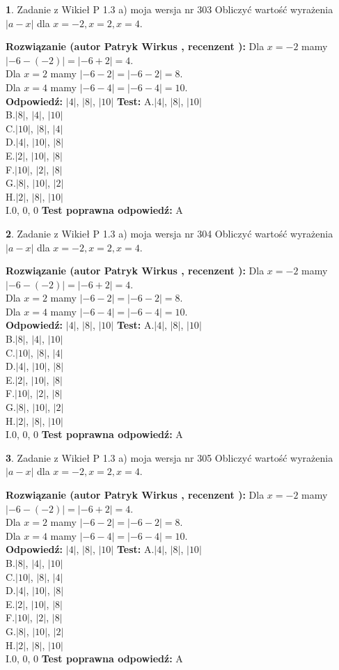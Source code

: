 \documentclass[12pt, a4paper]{article}
\theoremstyle{definition} %
\newtheorem{zad}{}
\newcommand{\zadStart}[1]{\begin{zad}#1\newline}
\newcommand{\zadStop}{\end{zad}}
\newcommand{\rozwStart}[2]{\noindent \textbf{Rozwiązanie (autor #1 , recenzent #2): }\newline}
\newcommand{\rozwStop}{\newline}
\newcommand{\odpStart}{\noindent \textbf{Odpowiedź:}\newline}
\newcommand{\odpStop}{\newline}
\newcommand{\testStart}{\noindent \textbf{Test:}\newline}
\newcommand{\testStop}{\newline}
\newcommand{\kluczStart}{\noindent \textbf{Test poprawna odpowiedź:}\newline}
\newcommand{\kluczStop}{\newline}
\begin{document}
\zadStart{Zadanie z Wikieł P 1.3 a) moja wersja nr 303}
Obliczyć wartość wyrażenia $|a - x|$ dla $x=-2,x=2,x=4$.
\zadStop
\rozwStart{Patryk Wirkus}{}
Dla $x = -2$ mamy $|-6 - (-2)| = |-6 + 2| = 4$.\\
Dla $x = 2$ mamy $|-6 - 2| = |-6 - 2| = 8$.\\
Dla $x = 4$ mamy $|-6 - 4| = |-6 - 4| = 10$.\\
\rozwStop
\odpStart
$|4|$, $|8|$, $|10|$
\odpStop
\testStart
A.$|4|$, $|8|$, $|10|$\\
B.$|8|$, $|4|$, $|10|$\\
C.$|10|$, $|8|$, $|4|$\\
D.$|4|$, $|10|$, $|8|$\\
E.$|2|$, $|10|$, $|8|$\\
F.$|10|$, $|2|$, $|8|$\\
G.$|8|$, $|10|$, $|2|$\\
H.$|2|$, $|8|$, $|10|$\\
I.$0$, $0$, $0$
\testStop
\kluczStart
A
\kluczStop



\zadStart{Zadanie z Wikieł P 1.3 a) moja wersja nr 304}
Obliczyć wartość wyrażenia $|a - x|$ dla $x=-2,x=2,x=4$.
\zadStop
\rozwStart{Patryk Wirkus}{}
Dla $x = -2$ mamy $|-6 - (-2)| = |-6 + 2| = 4$.\\
Dla $x = 2$ mamy $|-6 - 2| = |-6 - 2| = 8$.\\
Dla $x = 4$ mamy $|-6 - 4| = |-6 - 4| = 10$.\\
\rozwStop
\odpStart
$|4|$, $|8|$, $|10|$
\odpStop
\testStart
A.$|4|$, $|8|$, $|10|$\\
B.$|8|$, $|4|$, $|10|$\\
C.$|10|$, $|8|$, $|4|$\\
D.$|4|$, $|10|$, $|8|$\\
E.$|2|$, $|10|$, $|8|$\\
F.$|10|$, $|2|$, $|8|$\\
G.$|8|$, $|10|$, $|2|$\\
H.$|2|$, $|8|$, $|10|$\\
I.$0$, $0$, $0$
\testStop
\kluczStart
A
\kluczStop



\zadStart{Zadanie z Wikieł P 1.3 a) moja wersja nr 305}
Obliczyć wartość wyrażenia $|a - x|$ dla $x=-2,x=2,x=4$.
\zadStop
\rozwStart{Patryk Wirkus}{}
Dla $x = -2$ mamy $|-6 - (-2)| = |-6 + 2| = 4$.\\
Dla $x = 2$ mamy $|-6 - 2| = |-6 - 2| = 8$.\\
Dla $x = 4$ mamy $|-6 - 4| = |-6 - 4| = 10$.\\
\rozwStop
\odpStart
$|4|$, $|8|$, $|10|$
\odpStop
\testStart
A.$|4|$, $|8|$, $|10|$\\
B.$|8|$, $|4|$, $|10|$\\
C.$|10|$, $|8|$, $|4|$\\
D.$|4|$, $|10|$, $|8|$\\
E.$|2|$, $|10|$, $|8|$\\
F.$|10|$, $|2|$, $|8|$\\
G.$|8|$, $|10|$, $|2|$\\
H.$|2|$, $|8|$, $|10|$\\
I.$0$, $0$, $0$
\testStop
\kluczStart
A
\kluczStop
\end{document}
